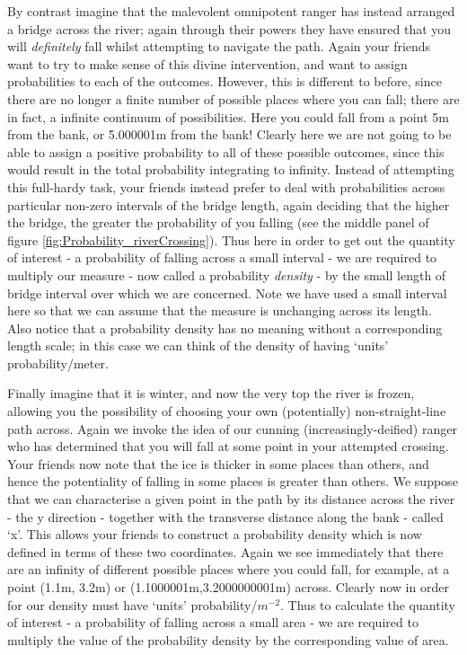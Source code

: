 \documentclass[11pt,fullpage]{book}
\begin{document}
By contrast imagine that the malevolent omnipotent ranger has instead arranged a bridge across the river; again through their powers they have ensured that you will \textit{definitely} fall whilst attempting to navigate the path. Again your friends want to try to make sense of this divine intervention, and want to assign probabilities to each of the outcomes. However, this is different to before, since there are no longer a finite number of possible places where you can fall; there are in fact, a infinite continuum of possibilities. Here you could fall from a point 5m from the bank, or 5.000001m from the bank! Clearly here we are not going to be able to assign a positive probability to all of these possible outcomes, since this would result in the total probability integrating to infinity. Instead of attempting this full-hardy task, your friends instead prefer to deal with probabilities across particular non-zero intervals of the bridge length, again deciding that the higher the bridge, the greater the probability of you falling (see the middle panel of figure \ref{fig:Probability_riverCrossing}). Thus here in order to get out the quantity of interest - a probability of falling across a small interval - we are required to multiply our measure - now called a probability \textit{density} - by the small length of bridge interval over which we are concerned. Note we have used a small interval here so that we can assume that the measure is unchanging across its length. Also notice that a probability density has no meaning without a corresponding length scale; in this case we can think of the density of having `units' probability/meter.  

Finally imagine that it is winter, and now the very top the river is frozen, allowing you the possibility of choosing your own (potentially) non-straight-line path across. Again we invoke the idea of our cunning (increasingly-deified) ranger who has determined that you will fall at some point in your attempted crossing. Your friends now note that the ice is thicker in some places than others, and hence the potentiality of falling in some places is greater than others. We suppose that we can characterise a given point in the path by its distance across the river - the y direction - together with the transverse distance along the bank - called `x'. This allows your friends to construct a probability density which is now defined in terms of these two coordinates. Again we see immediately that there are an infinity of different possible places where you could fall, for example, at a point (1.1m, 3.2m) or (1.1000001m,3.2000000001m) across. Clearly now in order for our density must have `units' probability/$m^{-2}$. Thus to calculate the quantity of interest - a probability of falling across a small area - we are required to multiply the value of the probability density by the corresponding value of area. 
\end{document}

